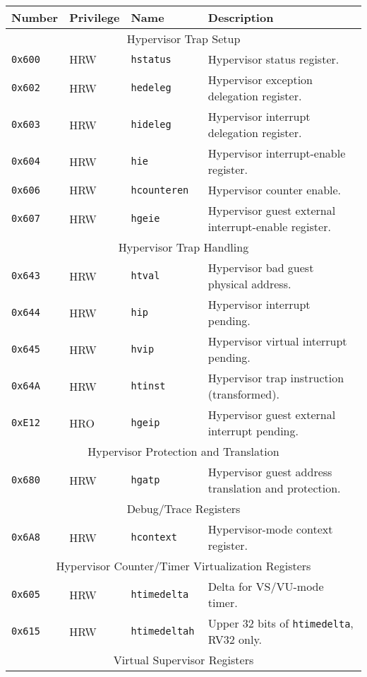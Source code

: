 \begin{table}[htb!]
\begin{center}
\begin{tabular}{|l|l|l|l|}
\hline
Number    & Privilege & Name & Description \\
\hline
\multicolumn{4}{|c|}{Hypervisor Trap Setup} \\
\hline
\hline
\tt 0x600 & HRW  &\tt hstatus    & Hypervisor status register. \\
\tt 0x602 & HRW  &\tt hedeleg    & Hypervisor exception delegation register. \\
\tt 0x603 & HRW  &\tt hideleg    & Hypervisor interrupt delegation register. \\
\tt 0x604 & HRW  &\tt hie        & Hypervisor interrupt-enable register. \\
\tt 0x606 & HRW  &\tt hcounteren & Hypervisor counter enable. \\
\tt 0x607 & HRW  &\tt hgeie      & Hypervisor guest external interrupt-enable register. \\
\hline
\multicolumn{4}{|c|}{Hypervisor Trap Handling} \\
\hline
\tt 0x643 & HRW  &\tt htval      & Hypervisor bad guest physical address. \\
\tt 0x644 & HRW  &\tt hip        & Hypervisor interrupt pending. \\
\tt 0x645 & HRW  &\tt hvip       & Hypervisor virtual interrupt pending. \\
\tt 0x64A & HRW  &\tt htinst     & Hypervisor trap instruction (transformed). \\
\tt 0xE12 & HRO  &\tt hgeip      & Hypervisor guest external interrupt pending. \\
\hline
\multicolumn{4}{|c|}{Hypervisor Protection and Translation} \\
\hline
\tt 0x680 & HRW  &\tt hgatp      & Hypervisor guest address translation and protection. \\
\hline
\multicolumn{4}{|c|}{Debug/Trace Registers} \\
\hline
\tt 0x6A8 & HRW &\tt hcontext & Hypervisor-mode context register. \\
\hline
\multicolumn{4}{|c|}{Hypervisor Counter/Timer Virtualization Registers} \\
\hline
\tt 0x605 & HRW  &\tt htimedelta   & Delta for VS/VU-mode timer. \\
\tt 0x615 & HRW  &\tt htimedeltah  & Upper 32 bits of {\tt htimedelta}, RV32 only. \\
\hline
\multicolumn{4}{|c|}{Virtual Supervisor Registers} \\

\end{tabular}
\end{center}
\end{table}
